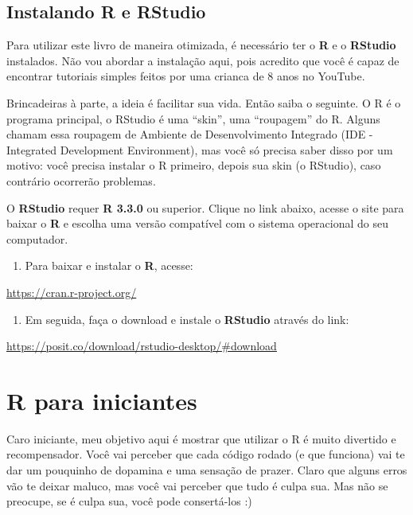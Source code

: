 \documentclass[
]{book}
\providecommand{\tightlist}{%
  \setlength{\itemsep}{0pt}\setlength{\parskip}{0pt}}
\begin{document}
\hypertarget{instalando-r-e-rstudio}{%
\section{Instalando R e RStudio}\label{instalando-r-e-rstudio}}

Para utilizar este livro de maneira otimizada, é necessário ter o \textbf{R} e o \textbf{RStudio} instalados. Não vou abordar a instalação aqui, pois acredito que você é capaz de encontrar tutoriais simples feitos por uma crianca de 8 anos no YouTube.

Brincadeiras à parte, a ideia é facilitar sua vida. Então saiba o seguinte. O R é o programa principal, o RStudio é uma ``skin'', uma ``roupagem'' do R. Alguns chamam essa roupagem de Ambiente de Desenvolvimento Integrado (IDE - Integrated Development Environment), mas você só precisa saber disso por um motivo: você precisa instalar o R primeiro, depois sua skin (o RStudio), caso contrário ocorrerão problemas.

O \textbf{RStudio} requer \textbf{R 3.3.0} ou superior. Clique no link abaixo, acesse o site para baixar o \textbf{R} e escolha uma versão compatível com o sistema operacional do seu computador.

\begin{enumerate}
\def\labelenumi{\arabic{enumi}.}
\tightlist
\item
  Para baixar e instalar o \textbf{R}, acesse:
\end{enumerate}

\url{https://cran.r-project.org/}

\begin{enumerate}
\def\labelenumi{\arabic{enumi}.}
\setcounter{enumi}{1}
\tightlist
\item
  Em seguida, faça o download e instale o \textbf{RStudio} através do link:
\end{enumerate}

\url{https://posit.co/download/rstudio-desktop/\#download}

\hypertarget{r-para-iniciantes}{%
\chapter{R para iniciantes}\label{r-para-iniciantes}}

Caro iniciante, meu objetivo aqui é mostrar que utilizar o R é muito divertido e recompensador. Você vai perceber que cada código rodado (e que funciona) vai te dar um pouquinho de dopamina e uma sensação de prazer. Claro que alguns erros vão te deixar maluco, mas você vai perceber que tudo é culpa sua. Mas não se preocupe, se é culpa sua, você pode consertá-los :)
\end{document}
